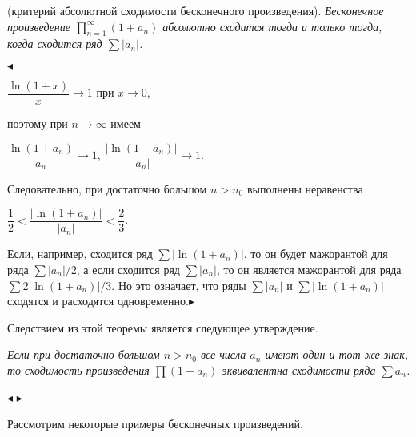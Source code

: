 \begin{theorem}
\label{se}
(критерий абсолютной сходимости бесконечного произведения). \slshape{Бесконечное произведение 
$\prod\limits_{n=1}^{\infty}(1 + a_{n})$ абсолютно сходится тогда и только тогда, когда сходится ряд $\sum|a_n|$.}
\end{theorem}

$\blacktriangleleft$ 
\begin{center}
$\dfrac{\ln(1 + x)}{x}\to 1\mbox{ при }x\to 0$,
\end{center}
поэтому при $n\to\infty$ имеем
\begin{center}
$\dfrac{\ln(1 + a_n)}{a_n}\to 1$, $\dfrac{|\ln(1 + a_n)|}{|a_n|}\to 1$.
\end{center}
Следовательно, при достаточно большом $n>n_0$ выполнены неравенства 
\begin{center}
$\dfrac12<\dfrac{|\ln(1 + a_n)|}{|a_n|}<\dfrac23$.
\end{center}
Если, например, сходится ряд $\sum|\ln(1 + a_n)|$, то он будет мажорантой для ряда $\sum|a_n|/2$, а если сходится ряд 
$\sum|a_n|$, то он является мажорантой для ряда $\sum 2|\ln(1 + a_n)|/3$. Но это означает, что ряды $\sum|a_n|$ и 
$\sum|\ln(1 + a_n)|$ сходятся и расходятся одновременно.$\blacktriangleright$


Следствием из этой теоремы является следующее утверждение.

\begin{approval}
\slshape{Если при достаточно большом $n>n_0$ все числа $a_n$ имеют один и тот же знак, то сходимость произведения
$\prod(1 + a_n)$ эквивалентна сходимости ряда $\sum a_n$}.
\end{approval}
$\blacktriangleleft$
\upshape\mdseries{} 
$\blacktriangleright$

Рассмотрим некоторые примеры бесконечных произведений.


